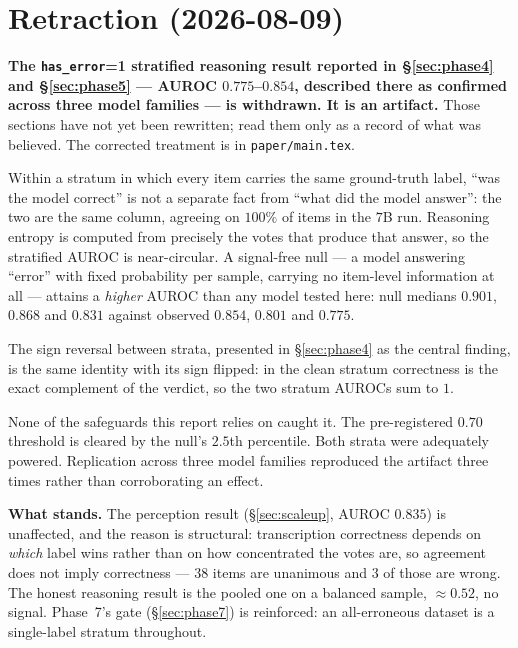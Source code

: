 \documentclass[11pt]{article}
\begin{document}
\section*{Retraction (2026-08-09)}
\label{sec:retraction}

\textbf{The \texttt{has\_error}=1 stratified reasoning result reported in
\S\ref{sec:phase4} and \S\ref{sec:phase5} --- AUROC $0.775$--$0.854$,
described there as confirmed across three model families --- is withdrawn.
It is an artifact.} Those sections have not yet been rewritten; read them
only as a record of what was believed. The corrected treatment is in
\texttt{paper/main.tex}.

Within a stratum in which every item carries the same ground-truth label,
``was the model correct'' is not a separate fact from ``what did the model
answer'': the two are the same column, agreeing on $100\%$ of items in the
$7$B run. Reasoning entropy is computed from precisely the votes that
produce that answer, so the stratified AUROC is near-circular. A
signal-free null --- a model answering ``error'' with fixed probability per
sample, carrying no item-level information at all --- attains a
\emph{higher} AUROC than any model tested here: null medians $0.901$,
$0.868$ and $0.831$ against observed $0.854$, $0.801$ and $0.775$.

The sign reversal between strata, presented in \S\ref{sec:phase4} as the
central finding, is the same identity with its sign flipped: in the clean
stratum correctness is the exact complement of the verdict, so the two
stratum AUROCs sum to $1$.

None of the safeguards this report relies on caught it. The pre-registered
$0.70$ threshold is cleared by the null's $2.5$th percentile. Both strata
were adequately powered. Replication across three model families
reproduced the artifact three times rather than corroborating an effect.

\textbf{What stands.} The perception result (\S\ref{sec:scaleup}, AUROC
$0.835$) is unaffected, and the reason is structural: transcription
correctness depends on \emph{which} label wins rather than on how
concentrated the votes are, so agreement does not imply correctness ---
$38$ items are unanimous and $3$ of those are wrong. The honest reasoning
result is the pooled one on a balanced sample, $\approx 0.52$, no signal.
Phase~7's gate (\S\ref{sec:phase7}) is reinforced: an all-erroneous dataset
is a single-label stratum throughout.
\end{document}
